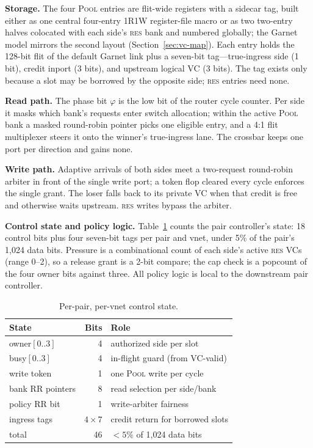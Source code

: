 \documentclass[10pt,twocolumn]{article}
\newcommand{\res}{\textsc{res}\xspace}
\newcommand{\pool}{\textsc{Pool}\xspace}
\begin{document}
\textbf{Storage.} The four \pool entries are flit-wide registers with a
sidecar tag, built either as one central four-entry 1R1W register-file macro
or as two two-entry halves colocated with each side's \res bank and numbered
globally; the Garnet model mirrors the second layout
(Section~\ref{sec:vc-map}). Each entry holds the 128-bit flit of the default
Garnet link plus a seven-bit tag---true-ingress side (1 bit), credit inport
(3 bits), and upstream logical VC (3 bits). The tag exists only because a
slot may be borrowed by the opposite side; \res entries need none.

\textbf{Read path.} The phase bit $\varphi$ is the low bit of the router
cycle counter. Per side it masks which bank's requests enter switch
allocation; within the active \pool bank a masked round-robin pointer picks
one eligible entry, and a 4:1 flit multiplexer steers it onto the winner's
true-ingress lane. The crossbar keeps one port per direction and gains none.

\textbf{Write path.} Adaptive arrivals of both sides meet a two-request
round-robin arbiter in front of the single write port; a token flop cleared
every cycle enforces the single grant. The loser falls back to its private
VC when that credit is free and otherwise waits upstream. \res writes bypass
the arbiter.

\textbf{Control state and policy logic.} Table~\ref{tab:state} counts the
pair controller's state: 18 control bits plus four seven-bit tags per pair
and vnet, under 5\% of the pair's 1{,}024 data bits. Pressure is a
combinational count of each side's active \res VCs (range 0--2), so a
release grant is a 2-bit compare; the cap check is a popcount of the four
owner bits against three. All policy logic is local to the downstream pair
controller.

\begin{table}[t]
\centering
\caption{Per-pair, per-vnet control state.}
\label{tab:state}
\small
\setlength{\tabcolsep}{4.5pt}
\begin{tabular}{lrl}
\toprule
State & Bits & Role\\
\midrule
owner$[0..3]$ & 4 & authorized side per slot\\
busy$[0..3]$ & 4 & in-flight guard (from VC-valid)\\
write token & 1 & one \pool write per cycle\\
bank RR pointers & 8 & read selection per side/bank\\
policy RR bit & 1 & write-arbiter fairness\\
ingress tags & $4\times7$ & credit return for borrowed slots\\
\midrule
total & 46 & $<5\%$ of 1{,}024 data bits\\
\bottomrule
\end{tabular}
\end{table}
\end{document}
